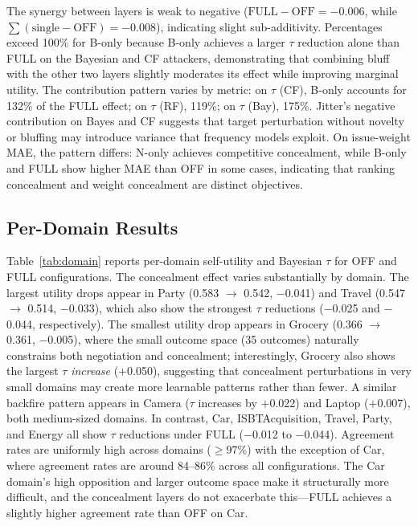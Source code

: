 \documentclass[runningheads]{llncs}
\begin{document}
The synergy between layers is weak to negative ($\text{FULL} - \text{OFF} = -0.006$, while $\sum(\text{single} - \text{OFF}) = -0.008$), indicating slight sub-additivity. Percentages exceed 100\% for B-only because B-only achieves a larger $\tau$ reduction alone than FULL on the Bayesian and CF attackers, demonstrating that combining bluff with the other two layers slightly moderates its effect while improving marginal utility. The contribution pattern varies by metric: on $\tau$ (CF), B-only accounts for 132\% of the FULL effect; on $\tau$ (RF), 119\%; on $\tau$ (Bay), 175\%. Jitter's negative contribution on Bayes and CF suggests that target perturbation without novelty or bluffing may introduce variance that frequency models exploit. On issue-weight MAE, the pattern differs: N-only achieves competitive concealment, while B-only and FULL show higher MAE than OFF in some cases, indicating that ranking concealment and weight concealment are distinct objectives.

\subsection{Per-Domain Results}

Table~\ref{tab:domain} reports per-domain self-utility and Bayesian $\tau$
for OFF and FULL configurations. The concealment effect varies substantially by domain. The largest utility drops appear in Party (0.583 $\to$ 0.542, $-$0.041) and Travel (0.547 $\to$ 0.514, $-$0.033), which also show the strongest $\tau$ reductions ($-$0.025 and $-$0.044, respectively). The smallest utility drop appears in Grocery (0.366 $\to$ 0.361, $-$0.005), where the small outcome space (35 outcomes) naturally constrains both negotiation and concealment; interestingly, Grocery also shows the largest $\tau$ \emph{increase} ($+$0.050), suggesting that concealment perturbations in very small domains may create more learnable patterns rather than fewer. A similar backfire pattern appears in Camera ($\tau$ increases by $+$0.022) and Laptop ($+$0.007), both medium-sized domains. In contrast, Car, ISBTAcquisition, Travel, Party, and Energy all show $\tau$ reductions under FULL ($-$0.012 to $-$0.044). Agreement rates are uniformly high across domains ($\geq$97\%) with the exception of Car, where agreement rates are around 84--86\% across all configurations. The Car domain's high opposition and larger outcome space make it structurally more difficult, and the concealment layers do not exacerbate this---FULL achieves a slightly higher agreement rate than OFF on Car.
\end{document}
